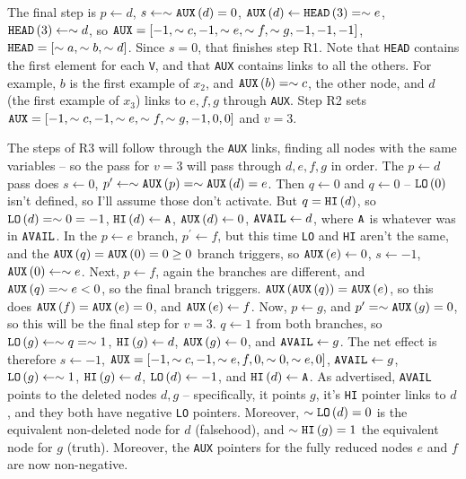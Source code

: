 The final step is $p \gets d$, $s \gets \sim {\tt AUX}\left(d\right) = 0$,
${\tt AUX}\left(d\right) \gets {\tt HEAD}\left(3\right) = \sim e$,
${\tt HEAD}\left(3\right) \gets \sim d$, so ${\tt AUX} = \left[ -1, \sim c, -1, \sim e, 
\sim f, \sim g, -1, -1, -1\right]$, ${\tt HEAD} = \left[\sim a, \sim b, \sim d\right]$.
Since $s = 0$, that finishes step R1.  Note that {\tt HEAD} contains
the first element for each {\tt V}, and that {\tt AUX} contains links to all the others.
For example, $b$ is the first example of $x_2$, and ${\tt AUX}\left(b\right) = \sim c$,
the other node, and $d$ (the first example of $x_3$) links to $e, f, g$ through 
{\tt AUX}. Step R2 sets ${\tt AUX} = \left[-1, \sim c, -1, \sim e, \sim f, \sim g, -1, 0, 0\right]$
and $v = 3$.  

The steps of R3 will follow through the {\tt AUX} links, finding
all nodes with the same variables -- so the pass for $v=3$ will pass
through $d, e, f, g$ in order.  The $p \gets d$ pass does
$s \gets 0$, $p^{\prime} \gets \sim {\tt AUX}\left(p\right) = \sim {\tt AUX}\left(d\right) = e$.
Then $q \gets 0$ and $q \gets 0$ -- ${\tt LO}\left(0\right)$ isn't defined, so I'll
assume those don't activate.  But $q = {\tt HI}\left(d\right)$, so ${\tt LO}\left(d\right) = 
\sim 0 = -1$, ${\tt HI}\left(d\right) \gets {\tt A}$, ${\tt AUX}\left(d\right) \gets 0$,
${\tt AVAIL} \gets d$, where ${\tt A}$ is whatever was in ${\tt AVAIL}$.
In the $p \gets e$ branch, $p^{\prime} \gets f$, but this time {\tt LO} and {\tt HI}
aren't the same, and the ${\tt AUX}\left(q\right) = {\tt AUX}\left(0\right) = 0 
\ge 0$ branch triggers, so ${\tt AUX}\left(e\right) \gets 0$, $s \gets -1$,
${\tt AUX}\left( 0 \right) \gets \sim e$.  Next, $p \gets f$, again
the branches are different, and ${\tt AUX}\left(q\right) = \sim e < 0$, so
the final branch triggers.  ${\tt AUX} \left( {\tt AUX} \left( q  \right) \right) =
{\tt AUX}\left(e\right)$, so this does ${\tt AUX}\left(f\right) = {\tt AUX}\left(e\right) = 0$,
and ${\tt AUX}\left(e\right) \gets f$.
Now, $p \gets g$, and $p^{\prime} = \sim {\tt AUX}\left(g\right) = 0$, so this will
be the final step for $v = 3$.  $q \gets 1$ from both branches, so
${\tt LO}\left(g\right) \gets \sim q = \sim 1$, ${\tt HI}\left(g\right) \gets d$,
${\tt AUX}\left(g\right) \gets 0$, and ${\tt AVAIL} \gets g$.
The net effect is therefore $s \gets -1$, 
${\tt AUX} = \left[-1, \sim c, -1, \sim e, f, 0, \sim 0, \sim e, 0\right]$,
${\tt AVAIL} \gets g$, ${\tt LO}\left(g\right) \gets \sim 1$, ${\tt HI}\left(g\right) \gets d$,
${\tt LO}\left(d\right) \gets -1$, and ${\tt HI}\left(d\right) \gets {\tt A}$.  As advertised,
{\tt AVAIL} points to the deleted nodes $d, g$ -- specifically, it points $g$,
it's {\tt HI} pointer links to $d$, and they both have negative {\tt LO} pointers.
Moreover, $\sim {\tt LO}\left(d\right) = 0$ is the equivalent non-deleted node
for $d$ (falsehood), and $\sim {\tt HI}\left(g\right) = 1$ the equivalent
node for $g$ (truth).  Moreover, the {\tt AUX} pointers for the fully
reduced nodes $e$ and $f$ are now non-negative.

